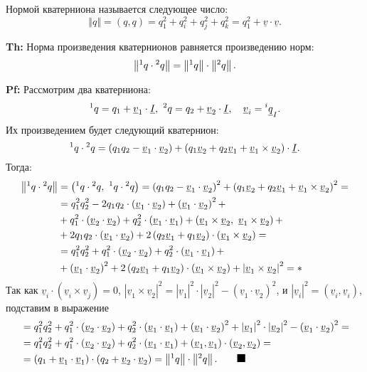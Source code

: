 \documentclass[fleqn]{extarticle}
\newcommand{\abs}[1]{ \left\vert #1 \right\vert }
\newcommand{\norm}[1]{ \left\Vert #1 \right\Vert }
\newcommand{\pares}[1]{ \left( #1 \right) }
\newcommand{\uv}{\underline{v}}
\newcommand{\uI}{\underline{I}}
\newcommand{\pq}[1]{\prescript{#1}{}{q}}
\begin{document}
			Нормой кватерниона называется следующее число:
			\[ \norm{q} = \pares{q, q} = q_1^2 + q_i^2 + q_j^2 + q_k^2 = q_1^2 + \uv \cdot \uv. \]

			\textbf{Th:} Норма произведения кватернионов равняется произведению норм:
				\[ \norm{\pq{1} \cdot \pq{2}} = \norm{\pq{1}} \cdot \norm{\pq{2}}. \]
			
			\textbf{Pf:} 
				Рассмотрим два кватерниона:
				\[ \pq{1} = q_1 + \uv_1 \cdot \uI, ~ \pq{2} = q_2 + \uv_2 \cdot \uI, \quad \uv_i = {\prescript{i}{}{\underline{q}}}_I. \]
				Их произведением будет следующий кватернион:
				\[ \pq{1} \cdot \pq{2} = \pares{q_1 q_2 - \uv_1 \cdot \uv_2} + \pares{q_1 \uv_2 + q_2 \uv_1 + \uv_1 \times \uv_2} \cdot \uI. \]
				Тогда:
				\[ \begin{split}
					\norm{\pq{1} \cdot \pq{2}} &= \pares{\pq{1} \cdot \pq{2}, ~ \pq{1} \cdot \pq{2}} = \pares{q_1 q_2 - \uv_1 \cdot \uv_2}^2 + \pares{q_1 \uv_2 + q_2 \uv_1 + \uv_1 \times \uv_2}^2 = \\
					&= q_1^2 q_2^2 - 2q_1 q_2 \cdot \pares{\uv_1 \cdot \uv_2} + \pares{\uv_1 \cdot \uv_2}^2 + \\ 
					&+ q_1^2 \cdot \pares{\uv_2 \cdot \uv_2} + q_2^2 \cdot \pares{\uv_1 \cdot \uv_1} + \pares{\uv_1 \times \uv_2,  ~ \uv_1 \times \uv_2} + \\
					&+ 2 q_1 q_2 \cdot \pares{\uv_1 \cdot \uv_2} + 2 \pares{q_2 \uv_1 + q_1 \uv_2} \cdot \pares{\uv_1 \times \uv_2} = \\
					&= q_1^2 q_2^2 + q_1^2 \cdot \pares{\uv_2 \cdot \uv_2} + q_2^2 \cdot \pares{\uv_1 \cdot \uv_1} + \\
					&+ \pares{\uv_1 \cdot \uv_2}^2 + 2 \pares{q_2 \uv_1 + q_1 \uv_2} \cdot \pares{\uv_1 \times \uv_2} + \abs{\uv_1 \times \uv_2}^2 = *
				\end{split} \]
				Так как $\uv_i \cdot \pares{\uv_i \times \uv_j} = 0$, $\abs{\uv_1 \times \uv_2}^2 = \abs{\uv_1}^2 \cdot \abs{\uv_2}^2 - \pares{\uv_1 \cdot \uv_2}^2$, и $\abs{\uv_i}^2 = \pares{\uv_i, \uv_i}$, подставим в выражение
				\[ \begin{split}
					&= q_1^2 q_2^2 + q_1^2 \cdot \pares{\uv_2 \cdot \uv_2} + q_2^2 \cdot \pares{\uv_1 \cdot \uv_1} + \pares{\uv_1 \cdot \uv_2}^2 + \abs{\uv_1}^2 \cdot \abs{\uv_2}^2 - \pares{\uv_1 \cdot \uv_2}^2 = \\
					&= q_1^2 q_2^2 + q_1^2 \cdot \pares{\uv_2 \cdot \uv_2} + q_2^2 \cdot \pares{\uv_1 \cdot \uv_1} + \pares{\uv_1, \uv_1} \cdot \pares{\uv_2, \uv_2} = \\
					&= \pares{q_1 + \uv_1 \cdot \uv_1} \cdot \pares{q_2 + \uv_2 \cdot \uv_2} = \norm{\pq{1}} \cdot \norm{\pq{2}}. \quad\quad \rule{8pt}{8pt}
				\end{split} \] 
\end{document}
